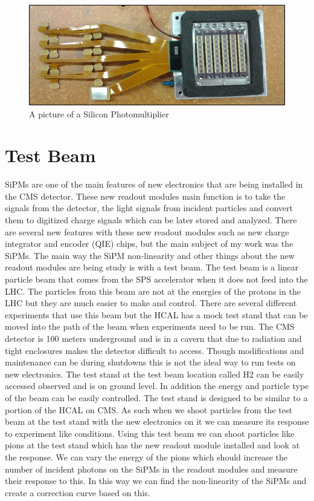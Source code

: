 \begin{figure}
\centering
\includegraphics[width=\linewidth]{SiPM.jpg}
\caption{A picture of a Silicon Photomultiplier}
\label{fig:SiPM}
\end{figure}

\section{Test Beam}
SiPMs are one of the main features of new electronics that are being installed in the CMS detector. These new readout modules main function is to take the signals from the detector, the light signals from incident particles and convert them to digitized charge signals which can be later stored and analyzed. There are several new features with these new readout modules such as new charge integrator and encoder (QIE) chips, but the main subject of my work was the SiPMs. The main way the SiPM non-linearity and other things about the new readout modules are being study is with a test beam. The test beam is a linear particle beam that comes from the SPS accelerator when it does not feed into the LHC. The particles from this beam are not at the energies of the protons in the LHC but they are much easier to make and control. There are several different experiments that use this beam but the HCAL has a mock test stand that can be moved into the path of the beam when experiments need to be run. The CMS detector is 100 meters underground and is in a cavern that due to radiation and tight enclosures makes the detector difficult to access. Though modifications and maintenance can be during shutdowns this is not the ideal way to run tests on new electronics. The test stand at the test beam location called H2 can be easily accessed observed and is on ground level. In addition the energy and particle type of the beam can be easily controlled. The test stand is designed to be similar to a portion of the HCAL on CMS. As such when we shoot particles from the test beam at the test stand with the new electronics on it we can measure its response to experiment like conditions. Using this test beam we can shoot particles like pions at the test stand which has the new readout module installed and look at the response. We can vary the energy of the pions which should increase the number of incident photons on the SiPMs in the readout modules and measure their response to this. In this way we can find the non-linearity of the SiPMs and create a correction curve based on this.

